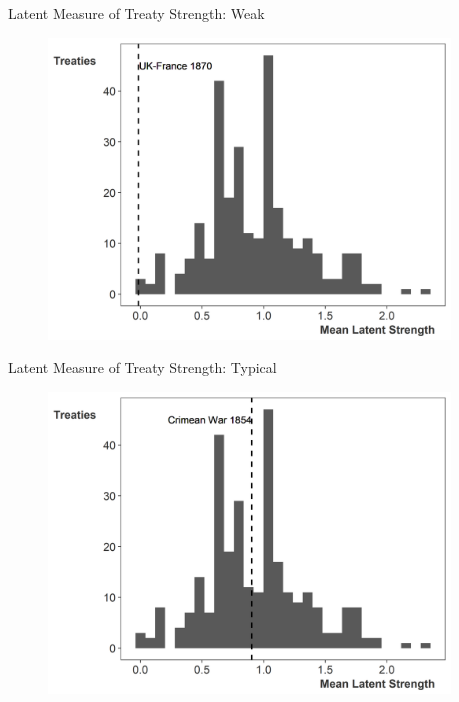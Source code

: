 \documentclass{beamer}
\begin{document}
\begin{frame}{Latent Measure of Treaty Strength: Weak}

\begin{figure}[htbp]
	\centering
		\includegraphics[width=0.95\textwidth]{ls-hist-weak.png}
\end{figure}


\end{frame} 


\begin{frame}{Latent Measure of Treaty Strength: Typical}

\begin{figure}[htbp]
	\centering
		\includegraphics[width=0.95\textwidth]{ls-hist-median.png}
\end{figure}


\end{frame} 
\end{document}
